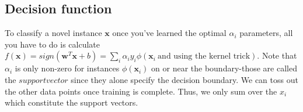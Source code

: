 \documentclass[a4paper]{article}
\begin{document}
\begin{algorithm}
\begin{algorithmic}
      
      \section{Decision function}
To classify a novel instance $\textbf{x}$ once you've learned the optimal $\alpha_{i}$ parameters, all you have to do is calculate $f(\textbf{x}) = sign(\textbf{w}^T\textbf{x}+b) = \sum_{i}\alpha_{i}y_{i}\phi(\textbf{x}_{i}\  \text{and using the kernel trick})$. Note that $\alpha_{i}$ is only non-zero for instances $\phi(\textbf{x}_{i})$ on or near the boundary-those are called the $support vector $ since they alone specify the decision boundary. We can toss out the other data points once training is complete. Thus, we only sum over the $x_{i}$ which constitute the support vectors.
  \end{algorithmic}
\end{algorithm} 
      
 \newpage





\end{document}
